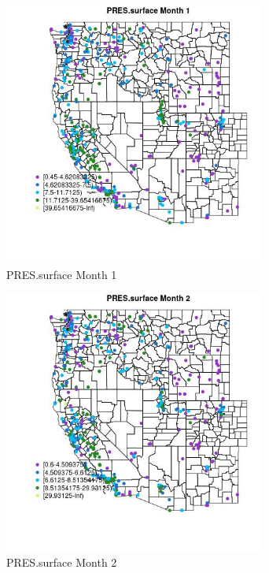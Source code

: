 \begin{figure} 
\centering  
\includegraphics[width=0.77\textwidth]{Code_Outputs/ML_input_report_ML_input_PM25_Step5_part_d_de_duplicated_aves_ML_input_MapObsMo1PRESsurface.jpg} 
\caption{\label{fig:ML_input_report_ML_input_PM25_Step5_part_d_de_duplicated_aves_ML_inputMapObsMo1PRESsurface}PRES.surface Month 1} 
\end{figure} 
 

\begin{figure} 
\centering  
\includegraphics[width=0.77\textwidth]{Code_Outputs/ML_input_report_ML_input_PM25_Step5_part_d_de_duplicated_aves_ML_input_MapObsMo2PRESsurface.jpg} 
\caption{\label{fig:ML_input_report_ML_input_PM25_Step5_part_d_de_duplicated_aves_ML_inputMapObsMo2PRESsurface}PRES.surface Month 2} 
\end{figure} 
 

